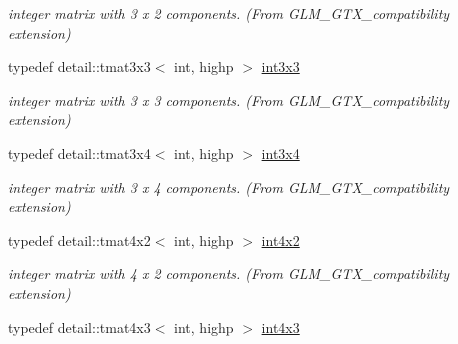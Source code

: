 \begin{CompactItemize}
\begin{CompactList}\small\item\em integer matrix with 3 x 2 components. (From GLM\_\-GTX\_\-compatibility extension) \item\end{CompactList}\item 
\hypertarget{group__gtx__compatibility_g8773c9f240dcac9f28d1afef71f7f779}{
typedef detail::tmat3x3$<$ int, highp $>$ \hyperlink{group__gtx__compatibility_g8773c9f240dcac9f28d1afef71f7f779}{int3x3}}
\label{group__gtx__compatibility_g8773c9f240dcac9f28d1afef71f7f779}

\begin{CompactList}\small\item\em integer matrix with 3 x 3 components. (From GLM\_\-GTX\_\-compatibility extension) \item\end{CompactList}\item 
\hypertarget{group__gtx__compatibility_g7cb1c0960d6551c34c666ad5829e9c65}{
typedef detail::tmat3x4$<$ int, highp $>$ \hyperlink{group__gtx__compatibility_g7cb1c0960d6551c34c666ad5829e9c65}{int3x4}}
\label{group__gtx__compatibility_g7cb1c0960d6551c34c666ad5829e9c65}

\begin{CompactList}\small\item\em integer matrix with 3 x 4 components. (From GLM\_\-GTX\_\-compatibility extension) \item\end{CompactList}\item 
\hypertarget{group__gtx__compatibility_gc391157aca117c5d52b10c2c3ca5c9be}{
typedef detail::tmat4x2$<$ int, highp $>$ \hyperlink{group__gtx__compatibility_gc391157aca117c5d52b10c2c3ca5c9be}{int4x2}}
\label{group__gtx__compatibility_gc391157aca117c5d52b10c2c3ca5c9be}

\begin{CompactList}\small\item\em integer matrix with 4 x 2 components. (From GLM\_\-GTX\_\-compatibility extension) \item\end{CompactList}\item 
\hypertarget{group__gtx__compatibility_ga80ec1b785920a08d366b3c09859d888}{
typedef detail::tmat4x3$<$ int, highp $>$ \hyperlink{group__gtx__compatibility_ga80ec1b785920a08d366b3c09859d888}{int4x3}}
\label{group__gtx__compatibility_ga80ec1b785920a08d366b3c09859d888}


\end{CompactItemize}
